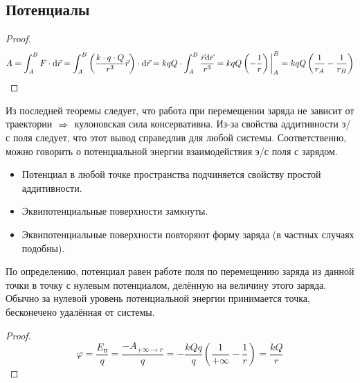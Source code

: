 \subsection{Потенциалы}
\begin{proof}
	\[ A = \int_A^B F \cdot \text{d} \vec{r} = \int_A^B \left( \frac{k \cdot q \cdot Q}{r^3} \vec{r} \right) \cdot \text{d} \vec{r} = kqQ \cdot \int_A^B \frac{\vec{r} \text{d} \vec{r}}{r^3} = kqQ \left(-\frac{1}{r} \right) \bigg|_{A}^{B} = kqQ \left( \frac{1}{r_A} - \frac{1}{r_B} \right) \]
\end{proof}

Из последней теоремы следует, что работа при перемещении заряда не зависит от траектории $\;\Rightarrow\;$ кулоновская сила консервативна. Из-за свойства аддитивности э/с поля следует, что этот вывод справедлив для любой системы. Соответственно, можно говорить о потенциальной энергии взаимодействия э/с поля с зарядом.\par


\begin{itemize}
	\item Потенциал в любой точке пространства подчиняется свойству простой аддитивности.
	\item Эквипотенциальные поверхности замкнуты.
	\item Эквипотенциальные поверхности повторяют форму заряда (в частных случаях подобны).
\end{itemize}

По определению, потенциал равен работе поля по перемещению заряда из данной точки в точку с нулевым потенциалом, делённую на величину этого заряда. Обычно за нулевой уровень потенциальной энергии принимается точка, бесконечено удалённая от системы. 

\begin{proof}
	\[ \varphi = \frac{E_\text{п}}{q} = \frac{-A_{+\infty \to r}}{q} = -\frac{kQq}{q}\left( \frac{1}{+\infty} - \frac{1}{r} \right) = \frac{kQ}{r} \]
\end{proof}

